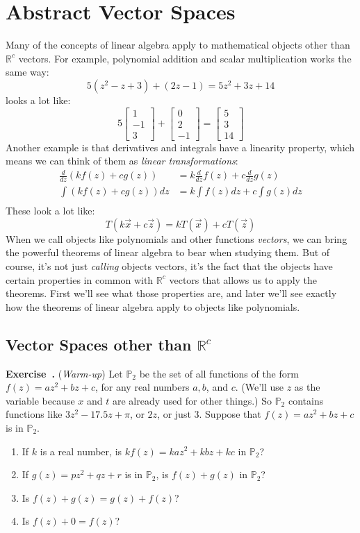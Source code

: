 \documentclass[11pt, letterpaper]{report}
\newcounter{exercise}[section]
\newcommand{\exercise}{\refstepcounter{exercise}\par%
\noindent\textbf{Exercise~\theexercise.} }
\newcounter{example}[section]
\newcounter{theorem}[chapter]
\newcommand{\R}{\mathbb{R}}
\newcommand{\bbbvec}[3]{
  \begin{bmatrix} #1 \\ #2 \\ #3 \end{bmatrix}
}
\begin{document}
\chapter{Abstract Vector Spaces}
\label{chap:abstract-vector-spaces}


Many of the concepts of linear algebra apply to mathematical objects other than $\R^c$ vectors. For example, polynomial addition and scalar multiplication works the same way:
\[5(z^2-z+3) + (2z-1) = 5z^2+3z+14\]
looks a lot like:  
\[5 \bbbvec{1}{-1}{3} + \bbbvec{0}{2}{-1}=\bbbvec{5}{3}{14}\]
Another example is that derivatives and integrals have a linearity property, which means we can think of them as \emph{linear transformations}:
\begin{align*}
\frac{d}{dz}( kf(z) + cg(z) ) &= k \frac{d}{dz}f(z) + c \frac{d}{dz}g(z) \\
\int ( kf(z)+cg(z) )dz &= k\int f(z)dz + c \int g(z)dz \\
\end{align*}
These look a lot like:
\[T(k\vec{x}+c\vec{z}) = kT(\vec{x}) + cT(\vec{z})\]
When we call objects like polynomials and other functions \emph{vectors}, we can bring the powerful theorems of linear algebra to bear when studying them. But of course, it's not just \emph{calling} objects vectors, it's the fact that the objects have certain properties in common with $\R^c$ vectors that allows us to apply the theorems. First we'll see what those properties are, and later we'll see exactly how the theorems of linear algebra apply to objects like polynomials.
\section{Vector Spaces other than $\R^c$}
\label{sec:vector-spaces-other-than-Rc}

\exercise (\emph{Warm-up}) \label{exercise:7.1-1} Let $\mathbb{P}_2$ be the set of all functions of the form $f(z) = az^2 + bz + c$, for any real numbers $a, b$, and $c$. (We'll use $z$ as the variable because $x$ and $t$ are already used for other things.) So $\mathbb{P}_2$ contains functions like $3z^2 - 17.5z + \pi$, or $2z$, or just $3$. Suppose that $f(z) = az^2 + bz + c$ is in $\mathbb{P}_2$.
\begin{enumerate}[label=(\alph*)]
  \item If $k$ is a real number, is $kf(z) = kaz^2 + kbz + kc$ in $\mathbb{P}_2$?
  \item If $g(z) = pz^2 + qz + r$ is in $\mathbb{P}_2$, is $f(z) + g(z)$ in $\mathbb{P}_2$?
  \item Is $f(z) + g(z) = g(z) + f(z)$?
  \item Is $f(z) + 0 = f(z)$?
\end{enumerate}
\end{document}
